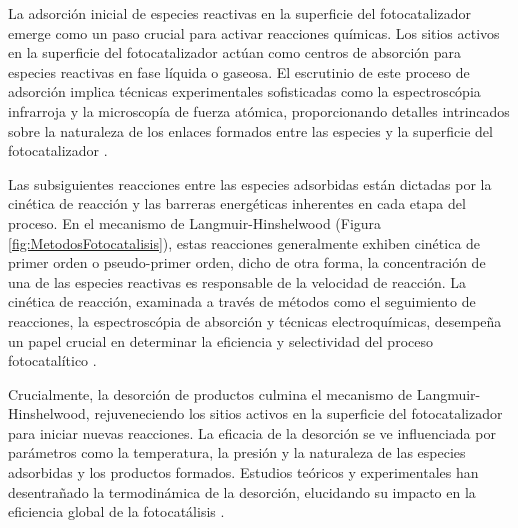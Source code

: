 \documentclass[12pt]{article}
\begin{document}
 La adsorción inicial de especies reactivas en la superficie del fotocatalizador emerge como un paso crucial para activar reacciones químicas. Los sitios activos en la superficie del fotocatalizador actúan como centros de absorción para especies reactivas en fase líquida o gaseosa. El escrutinio de este proceso de adsorción implica técnicas experimentales sofisticadas como la espectroscópia infrarroja y la microscopía de fuerza atómica, proporcionando detalles intrincados sobre la naturaleza de los enlaces formados entre las especies y la superficie del fotocatalizador \cite{IEEEreferencias:Ref10}.\vspace{1em} %

Las subsiguientes reacciones entre las especies adsorbidas están dictadas por la cinética de reacción y las barreras energéticas inherentes en cada etapa del proceso. En el mecanismo de Langmuir-Hinshelwood (Figura \ref{fig:MetodosFotocatalisis}), estas reacciones generalmente exhiben cinética de primer orden o pseudo-primer orden, dicho de otra forma, la concentración de una de las especies reactivas es responsable de la velocidad de reacción. La cinética de reacción, examinada a través de métodos como el seguimiento de reacciones, la espectroscópia de absorción y técnicas electroquímicas, desempeña un papel crucial en determinar la eficiencia y selectividad del proceso fotocatalítico \cite{IEEEreferencias:Ref10}. \vspace{1em} %

Crucialmente, la desorción de productos culmina el mecanismo de Langmuir-Hinshelwood, rejuveneciendo los sitios activos en la superficie del fotocatalizador para iniciar nuevas reacciones. La eficacia de la desorción se ve influenciada por parámetros como la temperatura, la presión y la naturaleza de las especies adsorbidas y los productos formados. Estudios teóricos y experimentales han desentrañado la termodinámica de la desorción, elucidando su impacto en la eficiencia global de la fotocatálisis \cite{IEEEreferencias:Ref10}.\vspace{1em} %
\end{document}
